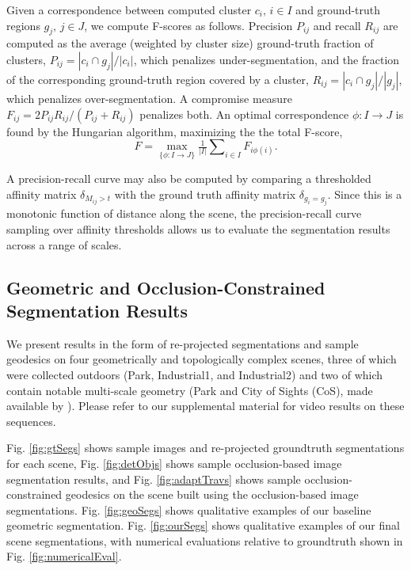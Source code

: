 Given a correspondence between computed cluster $c_i,\,i\in I$ and
ground-truth regions $g_j,\,j\in J$, we compute F-scores as follows.
Precision $P_{ij}$ and recall $R_{ij}$ are computed as the average (weighted by cluster size)
ground-truth fraction of clusters,
$P_{ij}=|c_i \cap g_j|/|c_i|$, which penalizes under-segmentation,
and the fraction of the corresponding ground-truth region covered by a cluster,
$R_{ij}=|c_i \cap g_j|/|g_j|$, which penalizes over-segmentation.
A compromise measure $F_{ij} = {2P_{ij}R_{ij}}/({P_{ij}+R_{ij}})$ penalizes both.
An optimal correspondence $\phi:I\to J$ is found by the Hungarian algorithm,
maximizing the the total F-score, 
\begin{equation}
F = \max_{\{\phi:I\to J\}}\tfrac{1}{|I|}\sum\nolimits_{i\in I} F_{i\phi(i)}.
\end{equation}

A precision-recall curve may also be computed by comparing a thresholded affinity
matrix $\delta_{M_{ij}>t}$ with the ground truth affinity matrix $\delta_{g_i=g_j}$. Since this is a 
monotonic function of distance along the scene, the precision-recall curve sampling over 
affinity thresholds allows us to evaluate the segmentation results across a range of scales. 



\subsection{Geometric and Occlusion-Constrained Segmentation Results}\label{sec:results}
We present results in the form of re-projected segmentations and sample geodesics on four geometrically and topologically complex scenes, three of which were
collected outdoors (Park, Industrial1, and Industrial2) and two of which contain notable multi-scale geometry (Park and City of Sights (CoS), made available by \cite{Graber2011}). Please refer to our supplemental material for video results on these sequences. 

Fig. \ref{fig:gtSegs} shows sample images and re-projected groundtruth segmentations for each scene, Fig. \ref{fig:detObjs} shows sample occlusion-based image segmentation results, and Fig. \ref{fig:adaptTravs} shows sample occlusion-constrained geodesics on the scene built using the occlusion-based image segmentations. Fig. \ref{fig:geoSegs} shows qualitative examples of our baseline geometric segmentation. Fig. \ref{fig:ourSegs} shows qualitative examples of our final scene segmentations, with numerical evaluations relative to groundtruth shown in Fig. \ref{fig:numericalEval}.

